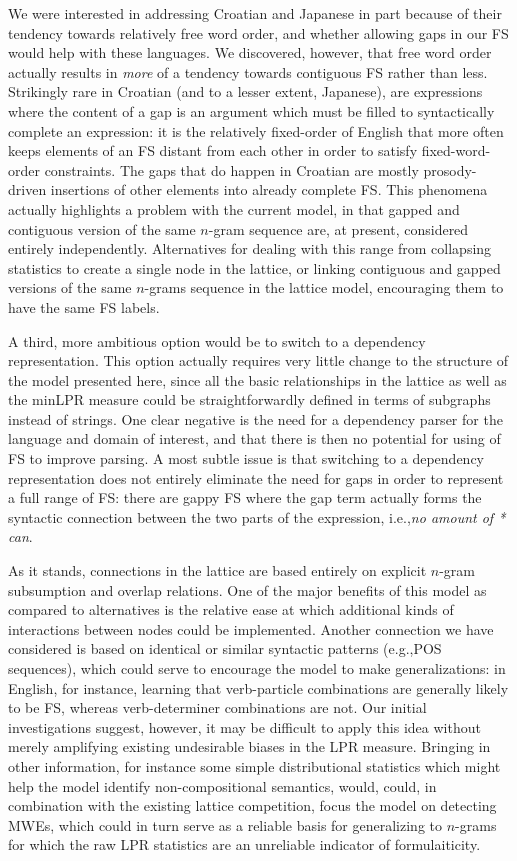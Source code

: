 \documentclass[11pt,letterpaper]{article}
\makeatletter
\def \eg {e.g.,\@ }
\def \ie {i.e.,\@ }
\newcommand{\ex}[1]{\textit{#1}\xspace}
\makeatother
\begin{document}
We were interested in addressing Croatian and Japanese in part because of their tendency towards relatively free word order, and whether allowing gaps in our FS would help with these languages. We discovered, however, that free word order actually results in \emph{more} of a tendency towards contiguous FS rather than less. Strikingly rare in Croatian (and to a lesser extent, Japanese), are expressions where the content of a gap is an argument which must be filled to syntactically complete an expression: it is the relatively fixed-order of English that more often keeps elements of an FS distant from each other in order to satisfy fixed-word-order constraints. The gaps that do happen in Croatian are mostly prosody-driven insertions of other elements into already complete FS. This phenomena actually highlights a problem with the current model, in that gapped and contiguous version of the same $n$-gram sequence are, at present, considered entirely independently. Alternatives for dealing with this range from collapsing statistics to create a single node in the lattice, or linking contiguous and gapped versions of the same $n$-grams sequence in the lattice model, encouraging them to have the same FS labels.

A third, more ambitious option would be to switch to a dependency representation. This option actually requires very little change to the structure of the model presented here, since all the basic relationships in the lattice as well as the minLPR measure could be straightforwardly defined in terms of subgraphs instead of strings. One clear negative is the need for a dependency parser for the language and domain of interest, and that there is then no potential for using of FS to improve parsing. A most subtle issue is that switching to a dependency representation does not entirely eliminate the need for gaps in order to represent a full range of FS: there are gappy FS where the gap term actually forms the syntactic connection between the two parts of the expression, \ie \ex{no amount of * can}.

As it stands, connections in the lattice are based entirely on explicit $n$-gram subsumption and overlap relations. One of the major benefits of this model as compared to alternatives is the relative ease at which additional kinds of interactions between nodes could be implemented. Another connection we have considered is based on identical or similar syntactic patterns (\eg POS sequences), which could serve to encourage the model to make generalizations: in English, for instance, learning that verb-particle combinations are generally likely to be FS, whereas verb-determiner combinations are not. Our initial investigations suggest, however, it may be difficult to apply this idea without merely amplifying existing undesirable biases in the LPR measure. Bringing in other information, for instance some simple distributional statistics which might help the model identify non-compositional semantics, would, could, in combination with the existing lattice competition, focus the model on detecting MWEs, which could in turn serve as a reliable basis for generalizing to $n$-grams for which the raw LPR statistics are an unreliable indicator of formulaiticity.
\end{document}
